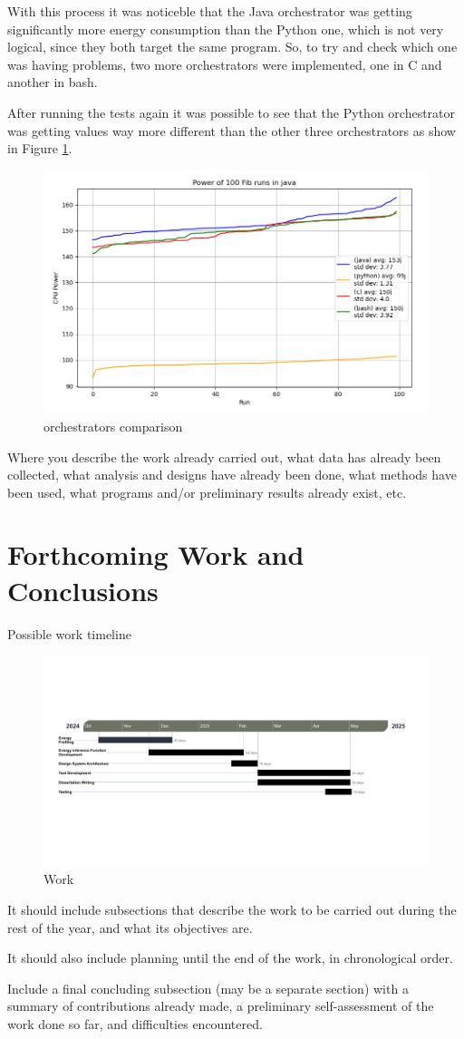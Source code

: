\documentclass[sigplan]{acmart}
\begin{document}
With this process it was noticeble that the Java orchestrator was getting significantly more energy consumption than the Python one, which is not very logical, since they both target the same program. So, to try and check which one was having problems, two more orchestrators were implemented, one in C and another in bash.

After running the tests again it was possible to see that the Python orchestrator was getting values way more different than the other three orchestrators as show in Figure \ref{fig:4_orchs_comparison}.

\begin{figure}%
  \centering
  \includegraphics[width = 0.5 \textwidth]{figures/4_orchestrators_comparison.png}
  \caption{orchestrators comparison}
  \label{fig:4_orchs_comparison}
\end{figure}

Where you describe the work already carried out, what data has already been collected, what analysis and designs have already been done, what methods have been used, what programs and/or preliminary results already exist, etc.

\section{Forthcoming Work and Conclusions} \label{sec:conclusions}

Possible work timeline

\begin{figure}[h]
  \centering
  \includegraphics[width = 0.5 \textwidth]{figures/gantt_diagram.png}
  \caption{Work}
  \label{fig:gantt_diagram}
\end{figure}


It should include subsections that describe the work to be carried out during the rest of the year, and what its objectives are.

It should also include planning until the end of the work, in chronological order.

Include a final concluding subsection (may be a separate section) with a summary of contributions already made, a preliminary self-assessment of the work done so far, and difficulties encountered.




\end{document}
